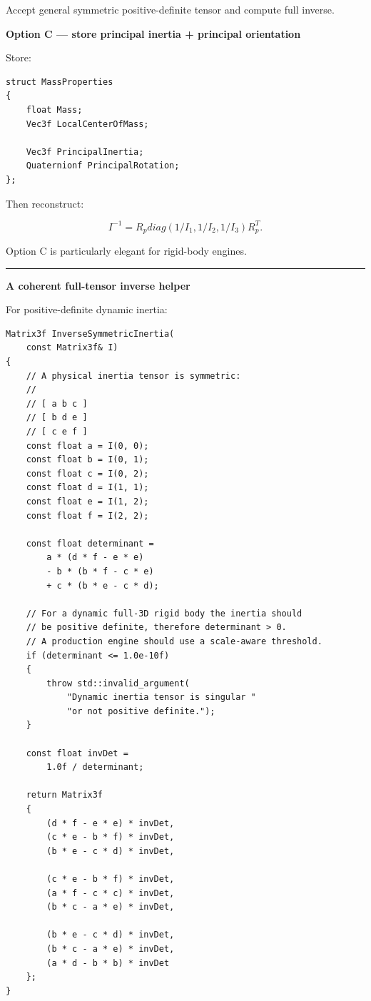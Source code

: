 Accept general symmetric positive-definite tensor and compute full inverse.

\textbf{Option C --- store principal inertia + principal orientation}

Store:

\begin{verbatim}
struct MassProperties
{
    float Mass;
    Vec3f LocalCenterOfMass;

    Vec3f PrincipalInertia;
    Quaternionf PrincipalRotation;
};
\end{verbatim}

Then reconstruct:

\[
I^{-1}
=
R_p
diag(
1/I_1,
1/I_2,
1/I_3)
R_p^T.
\]

Option C is particularly elegant for rigid-body engines.

\begin{center}\rule{0.5\linewidth}{0.5pt}\end{center}

\textbf{A coherent full-tensor inverse helper}

For positive-definite dynamic inertia:

\begin{verbatim}
Matrix3f InverseSymmetricInertia(
    const Matrix3f& I)
{
    // A physical inertia tensor is symmetric:
    //
    // [ a b c ]
    // [ b d e ]
    // [ c e f ]
    const float a = I(0, 0);
    const float b = I(0, 1);
    const float c = I(0, 2);
    const float d = I(1, 1);
    const float e = I(1, 2);
    const float f = I(2, 2);

    const float determinant =
        a * (d * f - e * e)
        - b * (b * f - c * e)
        + c * (b * e - c * d);

    // For a dynamic full-3D rigid body the inertia should
    // be positive definite, therefore determinant > 0.
    // A production engine should use a scale-aware threshold.
    if (determinant <= 1.0e-10f)
    {
        throw std::invalid_argument(
            "Dynamic inertia tensor is singular "
            "or not positive definite.");
    }

    const float invDet =
        1.0f / determinant;

    return Matrix3f
    {
        (d * f - e * e) * invDet,
        (c * e - b * f) * invDet,
        (b * e - c * d) * invDet,

        (c * e - b * f) * invDet,
        (a * f - c * c) * invDet,
        (b * c - a * e) * invDet,

        (b * e - c * d) * invDet,
        (b * c - a * e) * invDet,
        (a * d - b * b) * invDet
    };
}
\end{verbatim}

